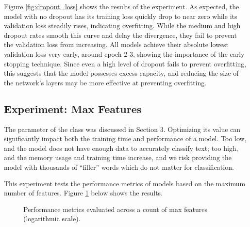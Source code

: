\documentclass{article}
\newcommand*{\code}[1]{\texttt{\detokenize{#1}}}
\begin{document}
Figure \ref{fig:dropout_loss} shows the results of the experiment. As expected, the model
with no dropout has its training loss quickly drop to near zero while its validation loss
steadily rises, indicating overfitting. While the medium and high dropout rates smooth
this curve and delay the divergence, they fail to prevent the validation loss from
increasing. All models achieve their absolute lowest validation loss very early, around
epoch 2-3, showing the importance of the early stopping technique. Since even a high level
of dropout fails to prevent overfitting, this suggests that the model possesses excess
capacity, and reducing the size of the network's layers may be more effective at preventing
overfitting.

\newpage

\subsection{Experiment: Max Features}

The \code{max_features} parameter of the \code{TfidfVectorizer} class was discussed in
Section 3. Optimizing its value can significantly impact both the training time and
performance of a model. Too low, and the model does not have enough data to accurately
classify text; too high, and the memory usage and training time increase, and we risk
providing the model with thousands of ``filler'' words which do not matter for classification.

This experiment tests the performance metrics of models based on the maximum number
of features. Figure \ref{fig:metrics_vs_max_features} below shows the results.

\begin{figure}[H]
    \centering
    \caption{Performance metrics evaluated across a count of max features (logarithmic scale).}
    \label{fig:metrics_vs_max_features}
\end{figure}
\end{document}
